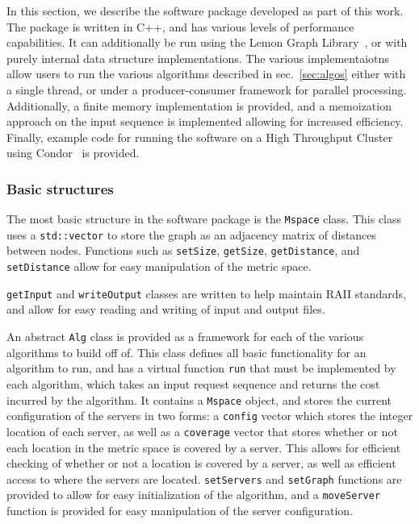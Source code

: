 In this section, we describe the software package developed as part of this work. The package is written in C++, and has various levels of performance capabilities. It can additionally be run using the Lemon Graph Library~\cite{lemon}, or with purely internal data structure implementations. The various implementaiotns allow users to run the various algorithms described in sec.~\ref{sec:algos} either with a single thread, or under a producer-consumer framework for parallel processing. Additionally, a finite memory implementation is provided, and a memoization approach on the input sequence is implemented allowing for increased efficiency. Finally, example code for running the software on a High Throughput Cluster using Condor~\cite{htcondor} is provided.

\subsubsection*{Basic structures}

The most basic structure in the software package is the \texttt{Mspace} class. This class uses a \texttt{std::vector} to store the graph as an adjacency matrix of distances between nodes. Functions such as \texttt{setSize}, \texttt{getSize}, \texttt{getDistance}, and \texttt{setDistance} allow for easy manipulation of the metric space.

\texttt{getInput} and \texttt{writeOutput} classes are written to help maintain RAII standards, and allow for easy reading and writing of input and output files. 

An abstract \texttt{Alg} class is provided as a framework for each of the various algorithms to build off of. This class defines all basic functionality for an algorithm to run, and has a virtual function \texttt{run} that must be implemented by each algorithm, which takes an input request sequence and returns the cost incurred by the algorithm. It contains a \texttt{Mspace} object, and stores the current configuration of the servers in two forms: a \texttt{config} vector which stores the integer location of each server, as well as a \texttt{coverage} vector that stores whether or not each location in the metric space is covered by a server. This allows for efficient checking of whether or not a location is covered by a server, as well as efficient access to where the servers are located. \texttt{setServers} and \texttt{setGraph} functions are provided to allow for easy initialization of the algorithm, and a \texttt{moveServer} function is provided for easy manipulation of the server configuration.

